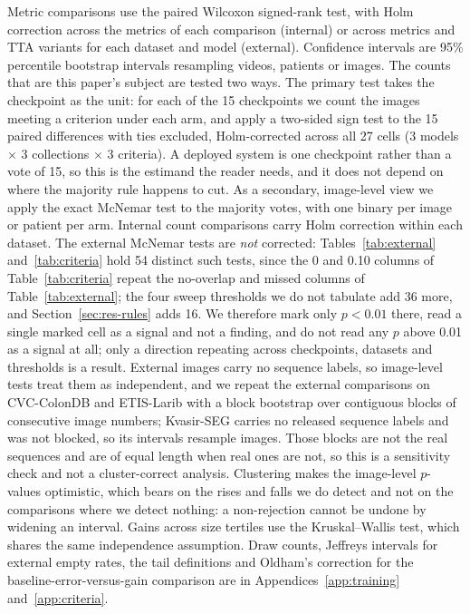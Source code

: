 Metric comparisons use the paired Wilcoxon signed-rank test, with Holm correction across the metrics of each comparison (internal) or across metrics and TTA variants for each dataset and model (external). Confidence intervals are 95\% percentile bootstrap intervals resampling videos, patients or images. The counts that are this paper's subject are tested two ways. The primary test takes the checkpoint as the unit: for each of the 15 checkpoints we count the images meeting a criterion under each arm, and apply a two-sided sign test to the 15 paired differences with ties excluded, Holm-corrected across all 27 cells (3 models $\times$ 3 collections $\times$ 3 criteria). A deployed system is one checkpoint rather than a vote of 15, so this is the estimand the reader needs, and it does not depend on where the majority rule happens to cut. As a secondary, image-level view we apply the exact McNemar test to the majority votes, with one binary per image or patient per arm. Internal count comparisons carry Holm correction within each dataset. The external McNemar tests are \emph{not} corrected: Tables~\ref{tab:external} and~\ref{tab:criteria} hold 54 distinct such tests, since the 0 and 0.10 columns of Table~\ref{tab:criteria} repeat the no-overlap and missed columns of Table~\ref{tab:external}; the four sweep thresholds we do not tabulate add 36 more, and Section~\ref{sec:res-rules} adds 16. We therefore mark only $p<0.01$ there, read a single marked cell as a signal and not a finding, and do not read any $p$ above 0.01 as a signal at all; only a direction repeating across checkpoints, datasets and thresholds is a result. External images carry no sequence labels, so image-level tests treat them as independent, and we repeat the external comparisons on CVC-ColonDB and ETIS-Larib with a block bootstrap \cite{kunsch1989block} over contiguous blocks of consecutive image numbers; Kvasir-SEG carries no released sequence labels and was not blocked, so its intervals resample images. Those blocks are not the real sequences and are of equal length when real ones are not, so this is a sensitivity check and not a cluster-correct analysis. Clustering makes the image-level $p$-values optimistic, which bears on the rises and falls we do detect and not on the comparisons where we detect nothing: a non-rejection cannot be undone by widening an interval. Gains across size tertiles use the Kruskal--Wallis test, which shares the same independence assumption. Draw counts, Jeffreys intervals for external empty rates, the tail definitions and Oldham's correction \cite{oldham1962} for the baseline-error-versus-gain comparison are in Appendices~\ref{app:training} and~\ref{app:criteria}.

